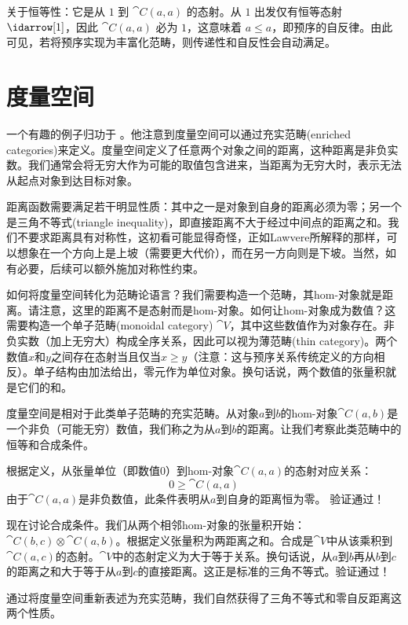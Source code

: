 关于恒等性：它是从 $1$ 到 $\cat{C}(a, a)$ 的态射。从 $1$ 出发仅有恒等态射 $\idarrow[1]$，因此 $\cat{C}(a, a)$ 必为 $1$，这意味着 $a \leqslant a$，即预序的自反律。由此可见，若将预序实现为丰富化范畴，则传递性和自反性会自动满足。

\section{度量空间}

一个有趣的例子归功于
。他注意到度量空间可以通过充实范畴(enriched categories)来定义。度量空间定义了任意两个对象之间的距离，这种距离是非负实数。我们通常会将无穷大作为可能的取值包含进来，当距离为无穷大时，表示无法从起点对象到达目标对象。

距离函数需要满足若干明显性质：其中之一是对象到自身的距离必须为零；另一个是三角不等式(triangle inequality)，即直接距离不大于经过中间点的距离之和。我们不要求距离具有对称性，这初看可能显得奇怪，正如Lawvere所解释的那样，可以想象在一个方向上是上坡（需要更大代价），而在另一方向则是下坡。当然，如有必要，后续可以额外施加对称性约束。

如何将度量空间转化为范畴论语言？我们需要构造一个范畴，其hom-对象就是距离。请注意，这里的距离不是态射而是hom-对象。如何让hom-对象成为数值？这需要构造一个单子范畴(monoidal category) $\cat{V}$，其中这些数值作为对象存在。非负实数（加上无穷大）构成全序关系，因此可以视为薄范畴(thin category)。两个数值$x$和$y$之间存在态射当且仅当$x \geqslant y$（注意：这与预序关系传统定义的方向相反）。单子结构由加法给出，零元作为单位对象。换句话说，两个数值的张量积就是它们的和。

度量空间是相对于此类单子范畴的充实范畴。从对象$a$到$b$的hom-对象$\cat{C}(a, b)$是一个非负（可能无穷）数值，我们称之为从$a$到$b$的距离。让我们考察此类范畴中的恒等和合成条件。

根据定义，从张量单位（即数值0）到hom-对象$\cat{C}(a, a)$的态射对应关系：
$$0 \geqslant \cat{C}(a, a)$$
由于$\cat{C}(a, a)$是非负数值，此条件表明从$a$到自身的距离恒为零。
验证通过！

现在讨论合成条件。我们从两个相邻hom-对象的张量积开始：$\cat{C}(b, c) \otimes \cat{C}(a, b)$。根据定义张量积为两距离之和。合成是$\cat{V}$中从该乘积到$\cat{C}(a, c)$的态射。$\cat{V}$中的态射定义为大于等于关系。换句话说，从$a$到$b$再从$b$到$c$的距离之和大于等于从$a$到$c$的直接距离。这正是标准的三角不等式。验证通过！

通过将度量空间重新表述为充实范畴，我们自然获得了三角不等式和零自反距离这两个性质。

